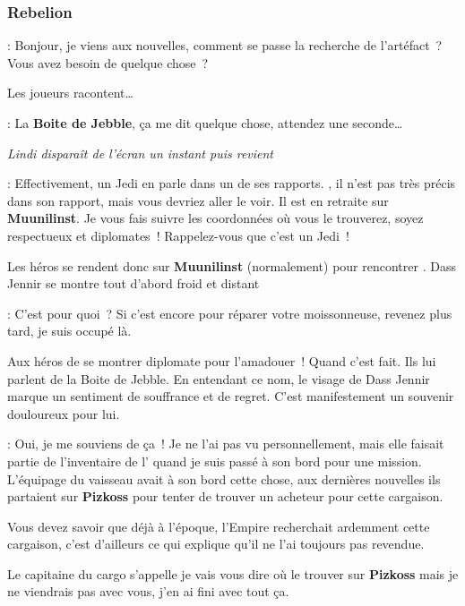 \subsubsection{Rebelion}
\begin{quotebox}
    : Bonjour, je viens aux nouvelles, comment se passe la recherche de l’artéfact~? Vous avez besoin de quelque chose~?
\end{quotebox}

Les joueurs racontent\ldots

\begin{quotebox}
    : La \textbf{Boite de Jebble}, ça me dit quelque chose, attendez une seconde\ldots 

    \textit{Lindi disparaît de l’écran un instant puis revient}

    : Effectivement, un Jedi en parle dans un de ses rapports. , il n’est pas très précis dans son rapport, mais vous devriez aller le voir. Il est en retraite sur \textbf{Muunilinst}. Je vous fais suivre les coordonnées où vous le trouverez, soyez respectueux et diplomates~! Rappelez-vous que c’est un Jedi~!
\end{quotebox}

Les héros se rendent donc sur \textbf{Muunilinst} (normalement) pour rencontrer . Dass Jennir se montre tout d’abord froid et distant
\begin{quotebox}
    : C’est pour quoi~? Si c’est encore pour réparer votre moissonneuse, revenez plus tard, je suis occupé là.
\end{quotebox}

Aux héros de se montrer diplomate pour l’amadouer~! Quand c’est fait. Ils lui parlent de la Boite de Jebble. En entendant ce nom, le visage de Dass Jennir marque un sentiment de souffrance et de regret. C’est manifestement un souvenir douloureux pour lui.
\begin{quotebox}
    : Oui, je me souviens de ça~! Je ne l’ai pas vu personnellement, mais elle faisait partie de l’inventaire de l’ quand je suis passé à son bord pour une mission. L’équipage du vaisseau avait à son bord cette chose, aux dernières nouvelles ils partaient sur \textbf{Pizkoss} pour tenter de trouver un acheteur pour cette cargaison.

    Vous devez savoir que déjà à l’époque, l’Empire recherchait ardemment cette cargaison, c’est d’ailleurs ce qui explique qu’il ne l’ai toujours pas revendue. 

    Le capitaine du cargo s’appelle  je vais vous dire où le trouver sur \textbf{Pizkoss} mais je ne viendrais pas avec vous, j’en ai fini avec tout ça.
\end{quotebox}

